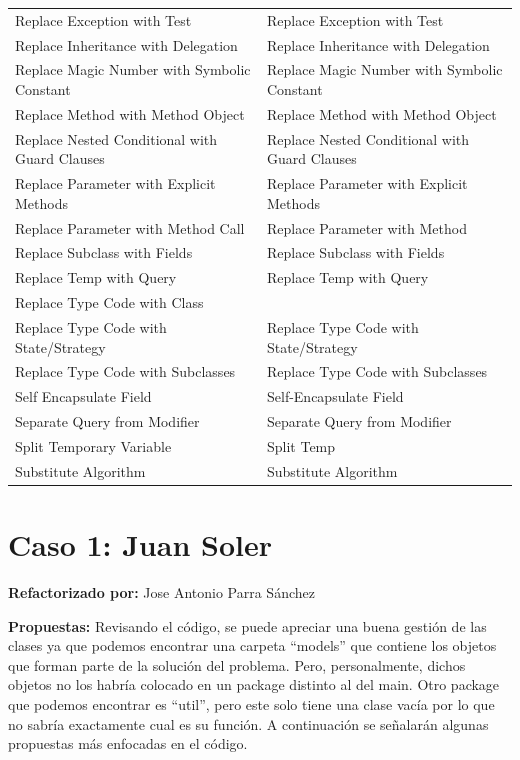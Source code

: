 \documentclass[11pt,a4paper,oneside]{book}
\begin{document}
\begin{longtable}{|p{200pt}|p{200pt}|}
    Replace Exception with Test & Replace Exception with Test\\ 
    Replace Inheritance with Delegation & Replace Inheritance with Delegation\\ 
    Replace Magic Number with Symbolic Constant & Replace Magic Number with Symbolic Constant\\ 
    Replace Method with Method Object & Replace Method with Method Object\\ 
    Replace Nested Conditional with Guard Clauses & Replace Nested Conditional with Guard Clauses\\ 
    Replace Parameter with Explicit Methods & Replace Parameter with Explicit Methods\\ 
    Replace Parameter with Method Call & Replace Parameter with Method\\ 
    Replace Subclass with Fields & Replace Subclass with Fields\\ 
    Replace Temp with Query & Replace Temp with Query\\ 
    Replace Type Code with Class & \\ 
    Replace Type Code with State/Strategy & Replace Type Code with State/Strategy\\ 
    Replace Type Code with Subclasses & Replace Type Code with Subclasses\\ 
    Self Encapsulate Field & Self-Encapsulate Field\\ 
    Separate Query from Modifier & Separate Query from Modifier\\ 
    Split Temporary Variable & Split Temp\\ 
    Substitute Algorithm &     Substitute Algorithm\\
\end{longtable}





\chapter{Caso 1: Juan Soler}
 \textbf{Refactorizado por:} Jose Antonio Parra Sánchez \newline

\textbf{Propuestas: } Revisando el código, se puede apreciar una buena gestión de las clases ya que podemos encontrar una carpeta ``models'' que contiene los objetos que forman parte de la solución del problema. Pero, personalmente, dichos objetos no los habría colocado en un package distinto al del main. Otro package que podemos encontrar es ``util'', pero este solo tiene una clase vacía por lo que no sabría exactamente cual es su función. A continuación se señalarán algunas propuestas más enfocadas en el código.
\end{document}
